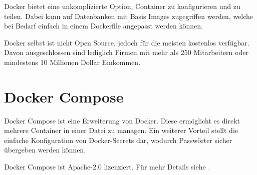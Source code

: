 Docker bietet eine unkomplizierte Option, Container zu konfigurieren und zu teilen.
Dabei kann auf Datenbanken mit Basis Images zugegriffen werden, welche bei Bedarf
einfach in einem Dockerfile angepasst werden können.

Docker selbst ist nicht Open Source, jedoch für die meisten kostenlos verfügbar.
Davon ausgeschlossen sind lediglich Firmen mit mehr als 250 Mitarbeitern oder mindestens 10 Millionen Dollar Einkommen.

\section{Docker Compose}\label{sec:docker-compose}

Docker Compose ist eine Erweiterung von Docker.
Diese ermöglicht es direkt mehrere Container in einer Datei zu managen.
Ein weiterer Vorteil stellt die einfache Konfiguration von Docker-Secrets dar, wodurch \ua Passwörter sicher übergeben werden können.

Docker Compose ist Apache-2.0 lizenziert.
Für mehr Details siehe .

